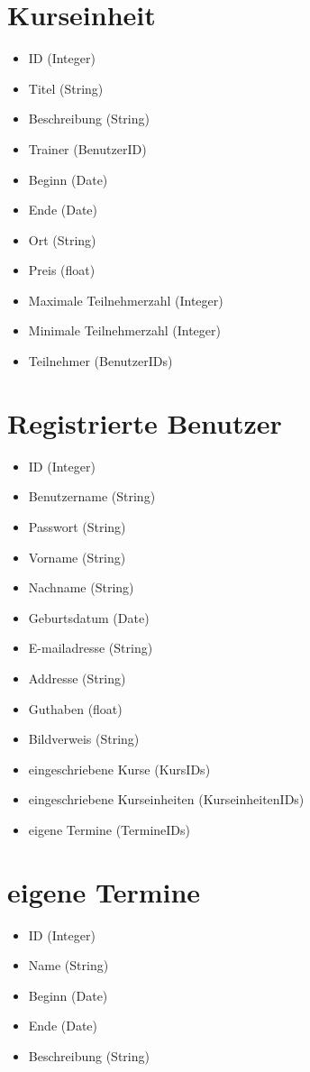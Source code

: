 \documentclass[a4paper]{scrreprt}
\newcounter{Lc}
\newcounter{Hc}
\newcommand{\stepHc}{\stepcounter{Hc}\setcounter{Lc}{0}}
\begin{document}
	\section{Kurseinheit}
	 \Func {} 
	 \begin{itemize}
	 	\item ID (Integer)
	 	\item Titel (String)
	 	\item Beschreibung (String)
	 	\item Trainer (BenutzerID)
	 	\item Beginn (Date)
	 	\item Ende (Date)
	 	\item Ort (String)
	 	\item Preis (float)
	 	\item Maximale Teilnehmerzahl (Integer)
	 	\item Minimale Teilnehmerzahl (Integer)
	 	\item Teilnehmer (BenutzerIDs)
	 \end{itemize}   
    
    
\stepHc	   		
    \section{Registrierte Benutzer}
		  \Func {} 
		  \begin{itemize}
		  	\item ID (Integer)
		  	\item Benutzername (String)
		  	\item Passwort (String)
		  	\item Vorname (String)
		  	\item Nachname (String)
		  	\item Geburtsdatum (Date)
		  	\item E-mailadresse (String)
		  	\item Addresse (String)
		  	\item Guthaben (float)
		  	\item Bildverweis (String)
		  	\item eingeschriebene Kurse (KursIDs)
		  	\item eingeschriebene Kurseinheiten (KurseinheitenIDs)
		  	\item eigene Termine (TermineIDs)
		  \end{itemize}

\stepHc		    
	  \section{eigene Termine}
	    \Func {} 
	    \begin{itemize}
	    	\item ID (Integer)
	    	\item Name (String)
	    	\item Beginn (Date)
	    	\item Ende (Date)
	    	\item Beschreibung (String)
	    \end{itemize}
	   
\end{document}

